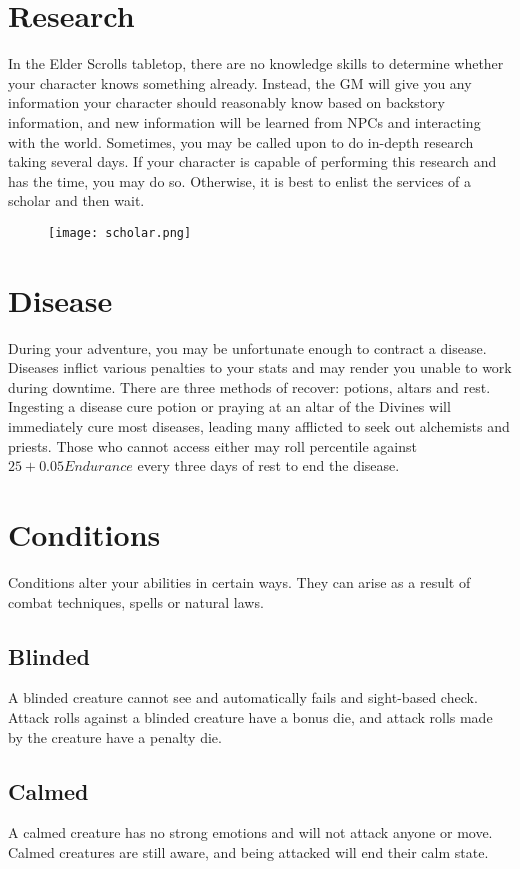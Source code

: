 \section{Research}
In the Elder Scrolls tabletop, there are no knowledge skills to determine whether your character knows something already. Instead, the GM will give you any information your character should reasonably know based on backstory information, and new information will be learned from NPCs and interacting with the world. Sometimes, you may be called upon to do in-depth research taking several days. If your character is capable of performing this research and has the time, you may do so. Otherwise, it is best to enlist the services of a scholar and then wait.

\begin{figure}[H]
	\texttt{[image: scholar.png]}
\end{figure}

\section{Disease}
During your adventure, you may be unfortunate enough to contract a disease. Diseases inflict various penalties to your stats and may render you unable to work during downtime. There are three methods of recover: potions, altars and rest. Ingesting a disease cure potion or praying at an altar of the Divines will immediately cure most diseases, leading many afflicted to seek out alchemists and priests. Those who cannot access either may roll percentile against $25+0.05Endurance$ every three days of rest to end the disease.

\section{Conditions}
Conditions alter your abilities in certain ways. They can arise as a result of combat techniques, spells or natural laws.

\subsection{Blinded}
A blinded creature cannot see and automatically fails and sight-based check. Attack rolls against a blinded creature have a bonus die, and attack rolls made by the creature have a penalty die.

\subsection{Calmed}
A calmed creature has no strong emotions and will not attack anyone or move. Calmed creatures are still aware, and being attacked will end their calm state.

